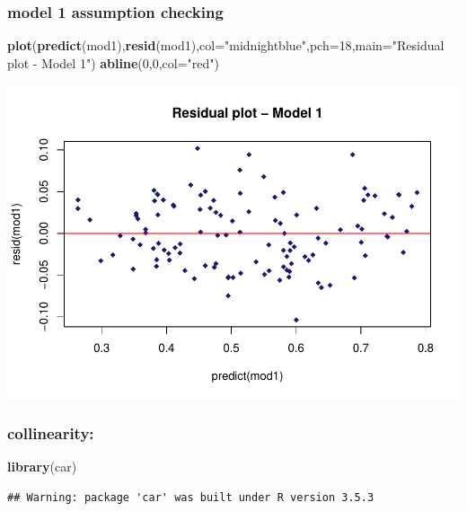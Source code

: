 \documentclass[
]{article}
\newenvironment{Shaded}{\begin{snugshade}}{\end{snugshade}}
\newcommand{\DataTypeTok}[1]{\textcolor[rgb]{0.13,0.29,0.53}{#1}}
\newcommand{\DecValTok}[1]{\textcolor[rgb]{0.00,0.00,0.81}{#1}}
\newcommand{\KeywordTok}[1]{\textcolor[rgb]{0.13,0.29,0.53}{\textbf{#1}}}
\newcommand{\NormalTok}[1]{#1}
\newcommand{\StringTok}[1]{\textcolor[rgb]{0.31,0.60,0.02}{#1}}
\begin{document}
\hypertarget{model-1-assumption-checking}{%
\subsubsection{model 1 assumption
checking}\label{model-1-assumption-checking}}

\begin{Shaded}
\begin{Highlighting}[]
\KeywordTok{plot}\NormalTok{(}\KeywordTok{predict}\NormalTok{(mod1),}\KeywordTok{resid}\NormalTok{(mod1),}\DataTypeTok{col=}\StringTok{"midnightblue"}\NormalTok{,}\DataTypeTok{pch=}\DecValTok{18}\NormalTok{,}\DataTypeTok{main=}\StringTok{"Residual plot - Model 1"}\NormalTok{)}
\KeywordTok{abline}\NormalTok{(}\DecValTok{0}\NormalTok{,}\DecValTok{0}\NormalTok{,}\DataTypeTok{col=}\StringTok{"red"}\NormalTok{)}
\end{Highlighting}
\end{Shaded}

\includegraphics{Zhong_paper_files/figure-latex/unnamed-chunk-3-1.pdf}

\hypertarget{collinearity}{%
\subsubsection{collinearity:}\label{collinearity}}

\begin{Shaded}
\begin{Highlighting}[]
\KeywordTok{library}\NormalTok{(car)}
\end{Highlighting}
\end{Shaded}

\begin{verbatim}
## Warning: package 'car' was built under R version 3.5.3
\end{verbatim}
\end{document}
